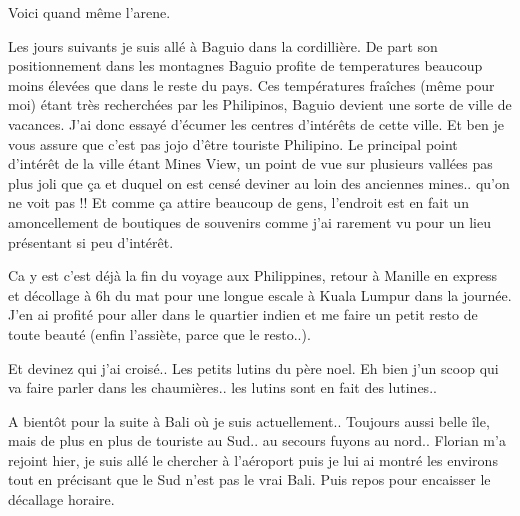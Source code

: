 \begin{multicols}{2}
Voici quand même l'arene.


Les jours suivants je suis allé à Baguio dans la cordillière. De part son positionnement dans les montagnes Baguio profite de temperatures beaucoup moins élevées que dans le reste du pays. Ces températures fraîches (même pour moi) étant très recherchées par les Philipinos, Baguio devient une sorte de ville de vacances. J'ai donc essayé d'écumer les centres d'intérêts de cette ville. Et ben je vous assure que c'est pas jojo d'être touriste Philipino. Le principal point d'intérêt de la ville étant Mines View, un point de vue sur plusieurs vallées pas plus joli que ça et duquel on est censé deviner au loin des anciennes mines.. qu'on ne voit pas !! Et comme ça attire beaucoup de gens, l'endroit est en fait un amoncellement de boutiques de souvenirs comme j'ai rarement vu pour un lieu présentant si peu d'intérêt.


Ca y est c'est déjà la fin du voyage aux Philippines, retour à Manille en express et décollage à 6h du mat pour une longue escale à Kuala Lumpur dans la journée. J'en ai profité pour aller dans le quartier indien et me faire un petit resto de toute beauté (enfin l'assiète, parce que le resto..).


Et devinez qui j'ai croisé.. Les petits lutins du père noel. Eh bien j'un scoop qui va faire parler dans les chaumières.. les lutins sont en fait des lutines..


A bientôt pour la suite à Bali où je suis actuellement.. Toujours aussi belle île, mais de plus en plus de touriste au Sud.. au secours fuyons au nord.. Florian m'a rejoint hier, je suis allé le chercher à l'aéroport puis je lui ai montré les environs tout en précisant que le Sud n'est pas le vrai Bali. Puis repos pour encaisser le décallage horaire.

\end{multicols}


